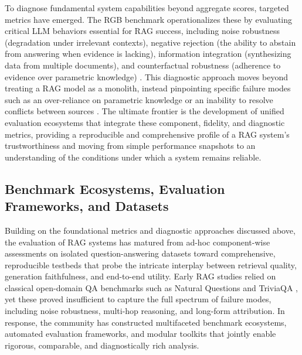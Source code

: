\documentclass[11pt,a4paper]{article}
\begin{document}
To diagnose fundamental system capabilities beyond aggregate scores, targeted metrics have emerged. The RGB benchmark operationalizes these by evaluating critical LLM behaviors essential for RAG success, including noise robustness (degradation under irrelevant contexts), negative rejection (the ability to abstain from answering when evidence is lacking), information integration (synthesizing data from multiple documents), and counterfactual robustness (adherence to evidence over parametric knowledge) \cite{arxiv:2309.01431v2}. This diagnostic approach moves beyond treating a RAG model as a monolith, instead pinpointing specific failure modes such as an over-reliance on parametric knowledge or an inability to resolve conflicts between sources \cite{arxiv:2307.11019v2}. The ultimate frontier is the development of unified evaluation ecosystems that integrate these component, fidelity, and diagnostic metrics, providing a reproducible and comprehensive profile of a RAG system's trustworthiness and moving from simple performance snapshots to an understanding of the conditions under which a system remains reliable.


\subsection{Benchmark Ecosystems, Evaluation Frameworks, and Datasets}


Building on the foundational metrics and diagnostic approaches discussed above, the evaluation of RAG systems has matured from ad-hoc component-wise assessments on isolated question-answering datasets toward comprehensive, reproducible testbeds that probe the intricate interplay between retrieval quality, generation faithfulness, and end-to-end utility. Early RAG studies relied on classical open-domain QA benchmarks such as Natural Questions and TriviaQA \cite{arxiv:2005.11401v4}, yet these proved insufficient to capture the full spectrum of failure modes, including noise robustness, multi-hop reasoning, and long-form attribution. In response, the community has constructed multifaceted benchmark ecosystems, automated evaluation frameworks, and modular toolkits that jointly enable rigorous, comparable, and diagnostically rich analysis.
\end{document}
